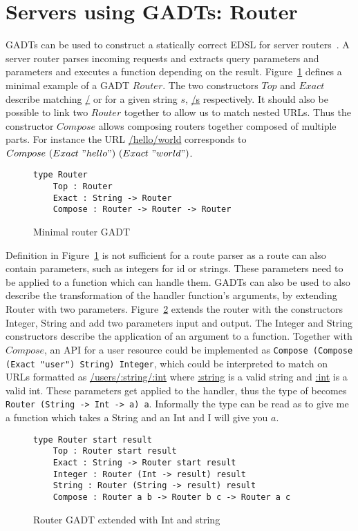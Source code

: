\section{Servers using GADTs: Router}\label{router}

GADTs can be used to construct a statically correct EDSL for server
routers~\cite{evanrouter}. A server router parses incoming requests and
extracts query parameters and parameters and executes a function depending on
the result. Figure~\ref{routergadtminimal} defines a minimal example of a GADT
$Router$.  The two constructors $Top$ and $Exact$ describe matching \url{/} or
for a given string $s$, \url{/s} respectively. It should also be possible to
link two $Router$ together to allow us to match nested URLs. Thus the
constructor $Compose$ allows composing routers together composed of multiple
parts.  For instance the URL \url{/hello/world} corresponds to $Compose\
(Exact\ "hello")\ (Exact\ "world")$.

\begin{figure}[H]
    \begin{lstlisting}
type Router 
    Top : Router 
    Exact : String -> Router 
    Compose : Router -> Router -> Router
    \end{lstlisting}
    \caption{Minimal router GADT}
    \label{routergadtminimal}
\end{figure}


Definition in Figure~\ref{routergadtminimal} is not sufficient for a route
parser as a route can also contain parameters, such as integers for id or
strings. These parameters need to be applied to a function which can handle
them. GADTs can also be used to also describe the transformation of the handler
function's arguments, by extending Router with two parameters.
Figure~\ref{extendedrouter} extends the router with the constructors Integer,
String and add two parameters input and output. The Integer and String
constructors describe the application of an argument to a function. Together
with $Compose$, an API for a user resource could be implemented as
\texttt{Compose (Compose (Exact "user") String) Integer}, which could be
interpreted to match on URLs formatted as \url{/users/:string/:int} where
\url{:string} is a valid string and \url{:int} is a valid int. These parameters
get applied to the handler, thus the type of becomes \texttt{Router (String ->
Int -> a) a}. Informally the type can be read as to give me a function which
takes a String and an Int and I will give you $a$.

\begin{figure}[H]
    \begin{lstlisting}
type Router start result 
    Top : Router start result
    Exact : String -> Router start result
    Integer : Router (Int -> result) result
    String : Router (String -> result) result
    Compose : Router a b -> Router b c -> Router a c
    \end{lstlisting}
    \caption{Router GADT extended with Int and string}
    \label{extendedrouter}
\end{figure}


